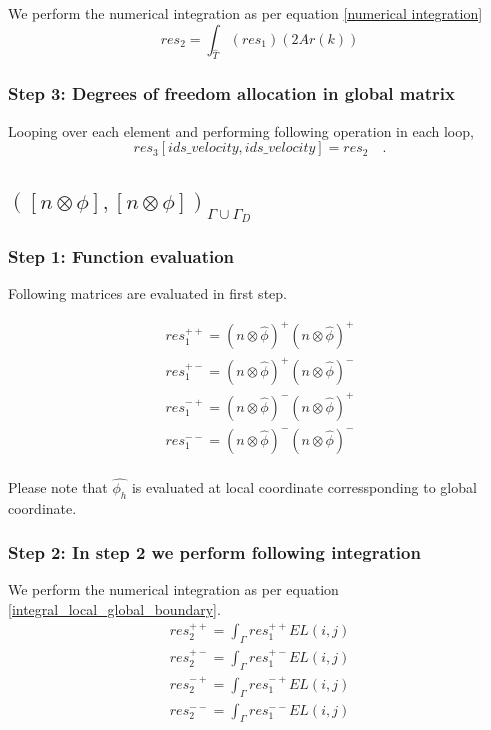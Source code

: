 \documentclass[a4paper,openany]{book}
\begin{document}
We perform the numerical integration as per equation \eqref{numerical integration} 
\begin{equation}
res_2 = \int_{\hat{T}} (res_1) (2 Ar(k))
\end{equation}

\subsubsection{Step 3: Degrees of freedom allocation in global matrix}
 
Looping over each element and performing following operation in each loop,
\begin{equation}
res_3[ids\_velocity,ids\_velocity]=res_2 \quad \textrm{.}
\end{equation}


\subsection{$([n \otimes \phi], [n \otimes \phi])_{\Gamma \cup \Gamma_D}$}

\subsubsection{Step 1: Function evaluation} 

Following matrices are evaluated in first step.

\begin{equation}
\begin{split}
res_1^{++} = (n \otimes \hat{\phi})^+ (n \otimes \hat{\phi})^+\\
res_1^{+-} = (n \otimes \hat{\phi})^+ (n \otimes \hat{\phi})^-\\
res_1^{-+} = (n \otimes \hat{\phi})^- (n \otimes \hat{\phi})^+\\
res_1^{--} = (n \otimes \hat{\phi})^- (n \otimes \hat{\phi})^-\\
\end{split}
\end{equation}

Please note that $\hat{\phi_h}$ is evaluated at local coordinate corressponding to global coordinate.

\subsubsection{Step 2: In step 2 we perform following integration}
 
We perform the numerical integration as per equation \ref{integral_local_global_boundary}.
\begin{equation}
\begin{split}
res_2^{++} = \int_{\Gamma} res_1^{++} EL(i,j)\\
res_2^{+-} = \int_{\Gamma} res_1^{+-} EL(i,j)\\
res_2^{-+} = \int_{\Gamma} res_1^{-+} EL(i,j)\\
res_2^{--} = \int_{\Gamma} res_1^{--} EL(i,j)\\
\end{split}
\end{equation}
\end{document}
